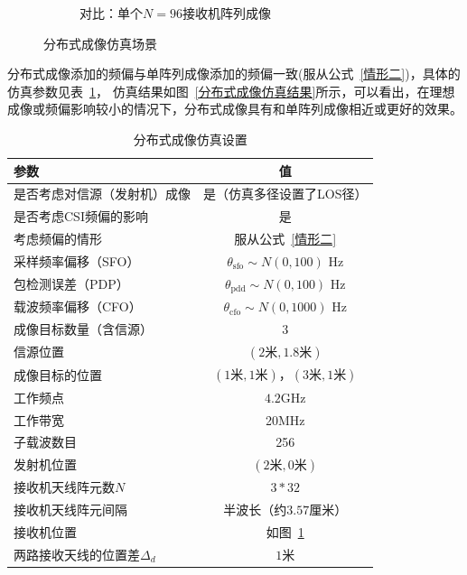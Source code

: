 \begin{figure}[H]
\begin{subfigure}[t]{.45\linewidth}
    \caption{对比：单个$N=96$接收机阵列成像}
  \end{subfigure}
  \caption{分布式成像仿真场景}
  \label{分布式成像仿真场景}
\end{figure}
分布式成像添加的频偏与单阵列成像添加的频偏一致(服从公式~\eqref{情形二})，具体的仿真参数见表~\ref{分布式成像仿真设置}，
仿真结果如图~\ref{分布式成像仿真结果}所示，可以看出，在理想成像或频偏影响较小的情况下，分布式成像具有和单阵列成像相近或更好的效果。
\begin{table}[htb]
      \begin{center}
          \caption{分布式成像仿真设置}\label{分布式成像仿真设置}
          \begin{tabular}{lc} %
              \toprule
              参数 & 值 \\
              \midrule
              是否考虑对信源（发射机）成像 & 是（仿真多径设置了LOS径）\\
              是否考虑CSI频偏的影响 & 是\\
              考虑频偏的情形  & 服从公式~\eqref{情形二}\\
              采样频率偏移（SFO）   &   $\theta_{\text{sfo}}\sim N(0,100)$ Hz\\
              包检测误差（PDP）     &   $\theta_{\text{pdd}}\sim N(0,100)$ Hz\\
              载波频率偏移（CFO）   &   $\theta_{\text{cfo}}\sim N(0,1000)$ Hz\\
              成像目标数量（含信源）    & 3\\
              信源位置        &  $(2\text{米},1.8\text{米})$ \\
              成像目标的位置  & $(1\text{米},1\text{米})$，$(3\text{米},1\text{米})$ \\
              工作频点        & $4.2$GHz\\
              工作带宽      & 20MHz \\
              子载波数目      & 256\\
              发射机位置           & $(2\text{米},0\text{米})$\\
              接收机天线阵元数$N$      & $3*32$\\
              接收机天线阵元间隔    & 半波长（约$3.57$厘米）\\
              接收机位置           & 如图~\ref{分布式成像仿真场景}\\
              两路接收天线的位置差$\Delta_d$ & $1$米\\
              \bottomrule
          \end{tabular}
      \end{center}
\end{table}

